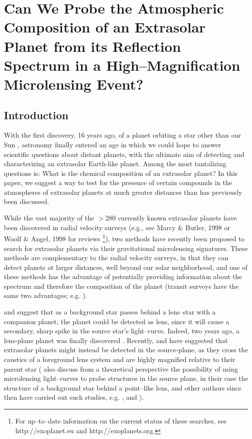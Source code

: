 \chapter[Can We Probe the Atmospheric Composition of an Extrasolar Planet from its Reflection Spectrum in a High--Magnification Microlensing Event?]{Can We Probe the Atmospheric Composition of an Extrasolar Planet from its Reflection Spectrum in a High--Magnification Microlensing Event?}
\label{ch:micro}
\markright{}



\section{Introduction}
\label{micro_sec:intro}
With the first discovery, 16 years ago, of a planet orbiting a star
other than our Sun \citep{wolszczan+frail1992}, astronomy finally
entered an age in which we could hope to answer scientific questions
about distant planets, with the ultimate aim of detecting and
characterizing an extrasolar Earth-like planet.  Among the most
tantalizing questions is: What is the chemical composition of an
extrasolar planet?  In this paper, we suggest a way to test for the
presence of certain compounds in the atmospheres of extrasolar planets
at much greater distances than has previously been discussed.

While the vast majority of the $>280$ currently known extrasolar
planets have been discovered in radial velocity surveys (e.g., see
Marcy \& Butler, 1998 or Woolf \& Angel, 1998 for reviews
\footnote{For up--to--date information on the current status of these
searches, see http://exoplanet.eu and http://exoplanets.org.}), two
methods have recently been proposed to search for extrasolar planets
via their gravitational microlensing signatures.  These methods are
complementary to the radial velocity surveys, in that they can detect
planets at larger distances, well beyond our solar neighborhood, and
one of these methods has the advantage of potentially providing
information about the spectrum and therefore the composition of the
planet (transit surveys have the same two advantages;
e.g. \citet{charbonneau_et_al2002}).

\citet{mao+paczynski1991} and \citet{gould+loeb1992} suggest that as a
background star passes behind a lens--star with a companion planet,
the planet could be detected as lens, since it will cause a secondary,
sharp spike in the source star's light--curve.  Indeed, two years ago,
a lens-plane planet was finally discovered \citep{bond_et_al2004}.
Recently, \citet*[hereafter GG00]{graff+gaudi2000} and
\citet{lewis+ibata2000} have suggested that extrasolar planets might
instead be detected in the source-plane, as they cross the caustics of
a foreground lens system and are highly magnified relative to their
parent star (\citet{heyrovsky+loeb1997} also discuss from a
theoretical perspective the possibility of using microlensing
light--curves to probe structures in the source plane, in their case
the structure of a background star behind a point--like lens, and
other authors since then have carried out such studies,
e.g. \citet{albrow_et_al1999}, and \citet{castro_et_al2001}).

